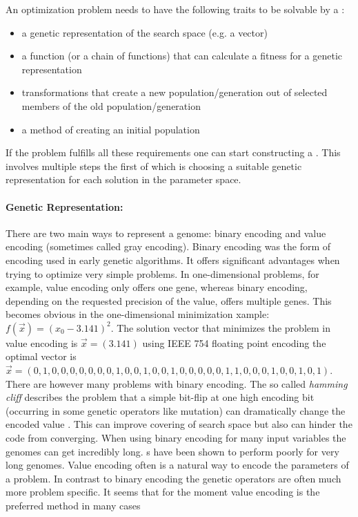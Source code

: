 An optimization problem needs to have the following traits to be solvable by a \ga:
\begin{itemize}
\item a genetic representation of the search space (e.g. a vector)
\item a function (or a chain of functions) that can calculate a fitness for a genetic representation
\item transformations that create a new population/generation out of selected members of the old population/generation
\item a method of creating an initial population
\end{itemize}


If the problem fulfills all these requirements one can start constructing a \ga. This involves multiple steps the first of which is choosing a suitable genetic representation for each solution in the parameter space. 

\paragraph{Genetic Representation:}
There are two main ways to represent a genome: binary encoding and value encoding (sometimes called gray encoding). Binary encoding was the form of encoding  used in early genetic algorithms. It offers significant advantages when trying to optimize very simple problems. In one-dimensional problems, for example, value encoding only offers one gene, whereas binary encoding, depending on the requested precision of the value, offers multiple genes. This becomes obvious in the one-dimensional minimization xample: $f(\vec{x})=(x_0 - 3.141)^2$. The solution vector that minimizes the problem in value encoding is $\vec{x} = (3.141)$ using IEEE 754 floating point encoding the optimal vector is $\vec{x}=(0,1,0,0,0,0,0,0,0,1,0,0,1,0,0,1,0,0,0,0,0,1,1,0,0,0,1,0,0,1,0,1)$.
There are however many problems with binary encoding. The so called \textit{hamming cliff} describes the problem that a simple bit-flip at one high encoding bit (occurring in some genetic operators like mutation) can dramatically change the encoded value \citep[e.g.][]{Chakraborty2003253}. This can improve covering of search space but also can hinder the code from converging. When using binary encoding for many input variables the genomes can get incredibly long. \ga s have been shown to perform poorly for very long genomes. Value encoding often is a natural way to encode the parameters of a problem. In contrast to binary encoding the genetic operators are often much more problem specific. It seems that for the moment value encoding is the preferred method in many cases \citep[e.g.][]{Janikow1991Comparison,Wright91geneticalgorithms,Goldberg90real-codedgenetic}

